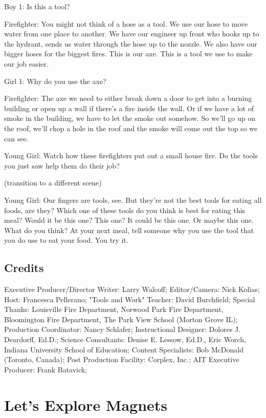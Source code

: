 Boy 1: Is this a tool?

Firefighter: You might not think of a hose as a tool. We use our hose to move water from one place to another. We have our engineer up front who hooks up to the hydrant, sends us water through the hose up to the nozzle. We also have our bigger hoses for the biggest fires. This is our axe. This is a tool we use to make our job easier.

Girl 1: Why do you use the axe?

Firefighter: The axe we need to either break down a door to get into a burning building or open up a wall if there's a fire inside the wall. Or if we have a lot of smoke in the building, we have to let the smoke out somehow. So we'll go up on the roof, we'll chop a hole in the roof and the smoke will come out the top so we can see.

Young Girl: Watch how these firefighters put out a small house fire. Do the tools you just saw help them do their job?

(transition to a different scene)

Young Girl: Our fingers are tools, see. But they're not the best tools for eating all foods, are they? Which one of these tools do you think is best for eating this meal? Would it be this one? This one? It could be this one. Or maybe this one. What do you think? At your next meal, tell someone why you use the tool that you do use to eat your food. You try it.

\subsection{Credits}

Executive Producer/Director Writer: Larry Walcoff;
Editor/Camera: Nick Kolias;
Host: Francesca Pellerano;
"Tools and Work" Teacher: David Burchfield;
Special Thanks: Louisville Fire Department, Norwood Park Fire Department, Bloomington Fire Department, The Park View School (Morton Grove IL);
Production Coordinator: Nancy Schlafer;
Instructional Designer: Dolores J. Deardorff, Ed.D.;
Science Consultants: Denise E. Lessow, Ed.D., Eric Worch, Indiana University School of Education;
Content Specialists: Bob McDonald (Toronto, Canada);
Post Production Facility: Corplex, Inc.;
AIT Executive Producer: Frank Batavick;

\section{Let's Explore Magnets}


